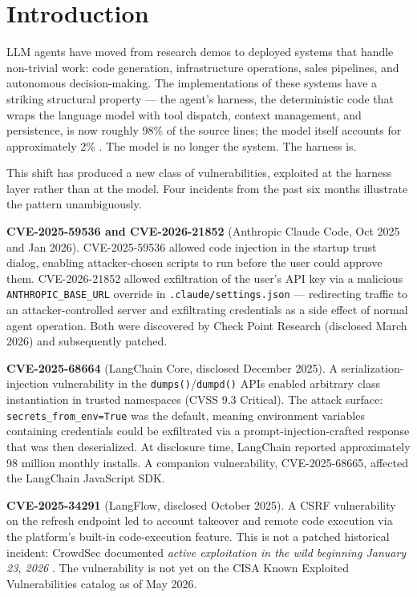 
\section{Introduction}
\label{sec:intro}

LLM agents have moved from research demos to deployed systems that handle
non-trivial work: code generation, infrastructure operations, sales pipelines,
and autonomous decision-making. The implementations of these systems have a
striking structural property — the agent's harness, the deterministic code that
wraps the language model with tool dispatch, context management, and persistence,
is now roughly 98\% of the source lines; the model itself accounts for
approximately 2\% \cite{liu2026clawdesign}. The model is no longer the system.
The harness is.

This shift has produced a new class of vulnerabilities, exploited at the harness
layer rather than at the model. Four incidents from the past six months
illustrate the pattern unambiguously.

\textbf{CVE-2025-59536 and CVE-2026-21852} (Anthropic Claude Code, Oct 2025 and
Jan 2026). CVE-2025-59536 allowed code injection in the startup trust dialog,
enabling attacker-chosen scripts to run before the user could approve them.
CVE-2026-21852 allowed exfiltration of the user's API key via a malicious
\texttt{ANTHROPIC\_BASE\_URL} override in \texttt{.claude/settings.json} —
redirecting traffic to an attacker-controlled server and exfiltrating credentials
as a side effect of normal agent operation. Both were discovered by Check Point
Research (disclosed March 2026) and subsequently patched.

\textbf{CVE-2025-68664} (LangChain Core, disclosed December 2025). A
serialization-injection vulnerability in the \texttt{dumps()}/\texttt{dumpd()}
APIs enabled arbitrary class instantiation in trusted namespaces (CVSS 9.3
Critical). The attack surface: \texttt{secrets\_from\_env=True} was the default,
meaning environment variables containing credentials could be exfiltrated via a
prompt-injection-crafted response that was then deserialized. At disclosure time,
LangChain reported approximately 98 million monthly installs. A companion
vulnerability, CVE-2025-68665, affected the LangChain JavaScript SDK.

\textbf{CVE-2025-34291} (LangFlow, disclosed October 2025). A CSRF vulnerability
on the refresh endpoint led to account takeover and remote code execution via
the platform's built-in code-execution feature. This is not a patched historical
incident: CrowdSec documented \emph{active exploitation in the wild beginning
January 23, 2026} \cite{crowdsec2026langflow}. The vulnerability is not yet on
the CISA Known Exploited Vulnerabilities catalog as of May 2026.

